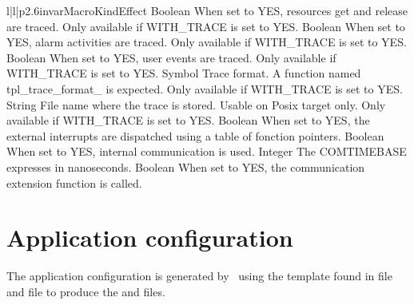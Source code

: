 \begin{longtableiii}{l|l|p{2.6in}}{var}{Macro}{Kind}{Effect}
  {Boolean}
  {When set to YES, resources get and release are traced. Only available if WITH_TRACE is set to YES.}
  {Boolean}
  {When set to YES, alarm activities are traced. Only available if WITH_TRACE is set to YES.}
  {Boolean}
  {When set to YES, user events are traced. Only available if WITH_TRACE is set to YES.}
  {Symbol}
  {Trace format. A function named tpl_trace_format_ is expected. Only available if WITH_TRACE is set to YES.}
  {String}
  {File name where the trace is stored. Usable on Posix target only. Only available if WITH_TRACE is set to YES.}
  {Boolean}
  {When set to YES, the external interrupts are dispatched using a table of fonction pointers.}
  {Boolean}
  {When set to YES, internal communication is used.}
  {Integer}
  {The COMTIMEBASE expresses in nanoseconds.}
  {Boolean}
  {When set to YES, the communication extension function is called.}
\end{longtableiii}

\section{Application configuration}

The application configuration is generated by \goil\ using the template found in  file and  file to produce the  and  files.